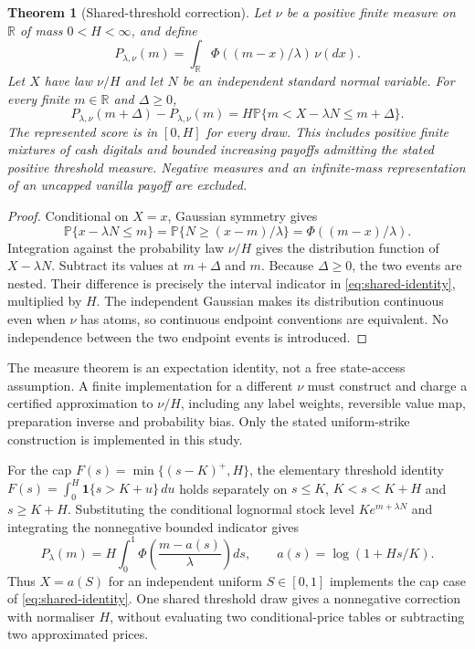 \documentclass[11pt]{article}
\newtheorem{theorem}{Theorem}
\newcommand{\Prb}{\mathbb P}
\begin{document}
\begin{theorem}[Shared-threshold correction]
Let $\nu$ be a positive finite measure on $\mathbb R$ of mass
$0<H<\infty$, and define
\[
 P_{\lambda,\nu}(m)=\int_{\mathbb R}
      \Phi((m-x)/\lambda)\,\nu(dx).
\]
Let $X$ have law $\nu/H$ and let $N$ be an independent standard normal
variable. For every finite $m\in\mathbb R$ and $\Delta\geq0$,
\[
 P_{\lambda,\nu}(m+\Delta)-P_{\lambda,\nu}(m)
   =H\Prb\{m<X-\lambda N\leq m+\Delta\}.
 \tag{S1}\label{eq:shared-identity}
\]
The represented score is in $[0,H]$ for every draw. This includes positive
finite mixtures of cash digitals and bounded increasing payoffs admitting
the stated positive threshold measure. Negative measures and an
infinite-mass representation of an uncapped vanilla payoff are excluded.
\end{theorem}
\begin{proof}
Conditional on $X=x$, Gaussian symmetry gives
\[
 \Prb\{x-\lambda N\leq m\}
 =\Prb\{N\geq(x-m)/\lambda\}
 =\Phi((m-x)/\lambda).
\]
Integration against the probability law $\nu/H$ gives the distribution
function of $X-\lambda N$. Subtract its values at $m+\Delta$ and $m$.
Because $\Delta\geq0$, the two events are nested. Their difference is
precisely the interval indicator in \eqref{eq:shared-identity}, multiplied
by $H$. The independent Gaussian makes its distribution continuous even
when $\nu$ has atoms, so continuous endpoint conventions are equivalent.
No independence between the two endpoint events is introduced.
\end{proof}

The measure theorem is an expectation identity, not a free state-access
assumption. A finite implementation for a different $\nu$ must construct
and charge a certified approximation to $\nu/H$, including any label
weights, reversible value map, preparation inverse and probability bias.
Only the stated uniform-strike construction is implemented in this study.

For the cap $F(s)=\min\{(s-K)^+,H\}$, the elementary threshold identity
$F(s)=\int_0^H\mathbf 1\{s>K+u\}\,du$ holds separately on
$s\leq K$, $K<s<K+H$ and $s\geq K+H$.
Substituting the conditional lognormal stock level $Ke^{m+\lambda N}$
and integrating the nonnegative bounded indicator gives
\[
 P_\lambda(m)=H\int_0^1
  \Phi\!\left(\frac{m-a(s)}{\lambda}\right)ds,
 \qquad a(s)=\log(1+Hs/K).
\]
Thus $X=a(S)$ for an independent uniform $S\in[0,1]$ implements the
cap case of \eqref{eq:shared-identity}. One shared threshold draw gives
a nonnegative correction with normaliser $H$, without evaluating two
conditional-price tables or subtracting two approximated prices.
\end{document}
